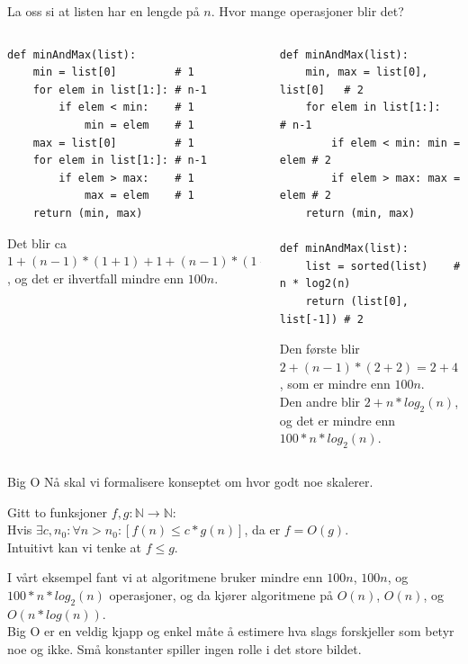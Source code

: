 \begin{frame}[fragile]{}
    La oss si at listen har en lengde på $n$. Hvor mange operasjoner blir det?
    \begin{columns}
        \begin{column}{0.45\textwidth}
            \begin{verbatim}
def minAndMax(list):
    min = list[0]         # 1
    for elem in list[1:]: # n-1
        if elem < min:    # 1
            min = elem    # 1
    max = list[0]         # 1
    for elem in list[1:]: # n-1
        if elem > max:    # 1
            max = elem    # 1
    return (min, max)
            \end{verbatim}
            Det blir ca $1 + (n-1)*(1+1) + 1 + (n-1)*(1+1) = 2 + 4*(n-1) = 4n-2$, og det er ihvertfall mindre enn \underline{$100n$}.
        \end{column}
        \pause
        \begin{column}{0.45\textwidth}
            \begin{verbatim}
def minAndMax(list):              
    min, max = list[0], list[0]   # 2
    for elem in list[1:]:         # n-1
        if elem < min: min = elem # 2
        if elem > max: max = elem # 2
    return (min, max)
    
def minAndMax(list):
    list = sorted(list)    # n * log2(n)
    return (list[0], list[-1]) # 2
            \end{verbatim}
            Den første blir $2+(n-1)*(2+2) = 2+4(n-1) = 4n-2$, som er mindre enn \underline{$100n$}.\\
            Den andre blir $2 + n*log_2(n)$, og det er mindre enn \underline{$100 * n * log_2(n)$}.
        \end{column}
    \end{columns}
\end{frame}

\begin{frame}{Big O}
    Nå skal vi formalisere konseptet om hvor godt noe skalerer.
    \begin{definition}[Big O]
        Gitt to funksjoner $f, g : \mathbb{N} \rightarrow \mathbb{N}$: \\
        Hvis $\exists c, n_0 : \forall n > n_0 : [ f(n) \leq c*g(n) ]$, da er $f = O(g)$.\\
        Intuitivt kan vi tenke at $f \leq g$.
    \end{definition}
    \pause
    I vårt eksempel fant vi at algoritmene bruker mindre enn $100n$, $100n$, og $100 * n * log_2(n)$ operasjoner, og da kjører algoritmene på $O(n)$, $O(n)$, og $O(n * log(n))$.\\[2mm]

    Big O er en veldig kjapp og enkel måte å estimere hva slags forskjeller som betyr noe og ikke. Små konstanter spiller ingen rolle i det store bildet.
\end{frame}

